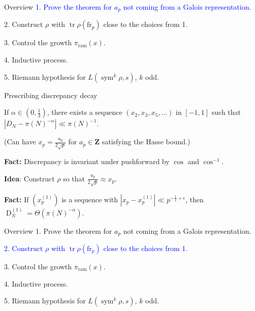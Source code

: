 \documentclass{beamer}
\DeclareMathOperator{\D}{D}
\DeclareMathOperator{\ram}{ram}
\DeclareMathOperator{\sym}{sym}
\DeclareMathOperator{\tr}{tr}
\newcommand{\bZ}{\mathbf{Z}}
\newcommand{\frob}{\mathrm{fr}}
\begin{document}
\begin{frame}{Overview}
\textcolor{blue}{
1. Prove the theorem for $a_p$ not coming from a Galois representation.}

\color{shade}
2. Construct $\rho$ with $\tr\rho(\frob_p)$ close to the choices from 1. 

3. Control the growth $\pi_{\ram}(x)$. 

4. Inductive process.

5. Riemann hypothesis for $L(\sym^k\rho,s)$, $k$ odd.
\end{frame}



\begin{frame}{Prescribing discrepancy decay}
\begin{theorem}
If $\alpha\in \left(0,\frac 1 3\right)$, there exists a sequence 
$(x_2,x_3,x_5,\dots)$ in $[-1,1]$ such that 
$| D_N - \pi(N)^{-\alpha}| \ll \pi(N)^{-1}$. 
\end{theorem}
\pause

(Can have $x_p = \frac{a_p}{2\sqrt p}$ for $a_p\in \bZ$ satisfying the 
Hasse bound.) 
\pause

\textbf{Fact:} 
Discrepancy is invariant under pushforward by $\cos$ and $\cos^{-1}$. 
\pause

\textbf{Idea}:
Construct $\rho$ so that $\frac{a_p}{2\sqrt p}\approx x_p$. 
\pause

\textbf{Fact:} 
If $(x_p^{(1)})$ is a sequence with $|x_p - x_p^{(1)}| \ll p^{-\frac 1 2+\epsilon}$, 
then $\D_N^{(1)} = \Theta(\pi(N)^{-\alpha})$. 
\end{frame}



\begin{frame}{Overview}
\color{shade}
1. Prove the theorem for $a_p$ not coming from a Galois representation.

\textcolor{blue}{
2. Construct $\rho$ with $\tr\rho(\frob_p)$ close to the choices from 1.}

3. Control the growth $\pi_{\ram}(x)$. 

4. Inductive process.

5. Riemann hypothesis for $L(\sym^k\rho,s)$, $k$ odd.
\end{frame}
\end{document}
